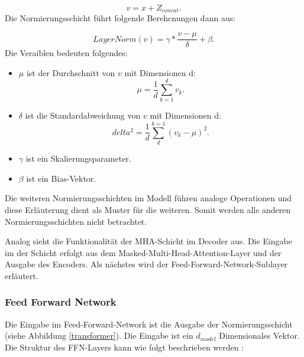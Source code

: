 \begin{equation}
	v = x + Z_{concat}.
\end{equation}
Die Normierungsschicht führt folgende Berehcnungen dann aus:

\begin{equation}
	LayerNorm(v) = \gamma * \frac{v - \mu}{\delta} + \beta.
\end{equation}
Die Veraiblen bedeuten folgendes:

\begin{itemize}[leftmargin=1cm]
		\item $\mu$ ist der Durchschnitt von $v$ mit Dimensionen d:
		\begin{equation}
			\mu = \frac{1}{d}\sum_{k=1}^{d} v_k.
		\end{equation}
		\item $\delta$ ist die Standardabweichung von $v$ mit Dimensionen d:
		\begin{equation}
			delta^2 = \frac{1}{d}\sum_{d}^{k=1} (v_k - \mu)^2.
		\end{equation}
		\item $\gamma$ ist ein Skalierungsparameter.
		\item $\beta$ ist ein Bias-Vektor.
\end{itemize}

Die weiteren Normierungsschichten im Modell führen analoge Operationen und diese Erläuterung dient als Muster für die weiteren. Somit werden alle anderen Normierungsschichten nicht betrachtet.

Analog sieht die Funktionalität der MHA-Schicht im Decoder aus. Die Eingabe im der Schicht erfolgt aus dem Masked-Multi-Head-Attention-Layer und der Ausgabe des Encoders. Als nächstes wird der Feed-Forward-Network-Sublayer erläutert.

\subsubsection{Feed Forward Network}

Die Eingabe im Feed-Forward-Network ist die Ausgabe der Normierungsschicht (siehe Abbildung \ref{transformer}). Die Eingabe ist ein $d_{model}$ Dimensionales Vektor. Die Struktur des FFN-Layers kann wie folgt beschrieben werden \cite{Vaswani:2017}:

